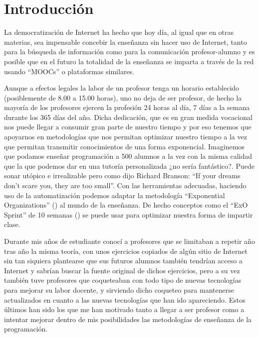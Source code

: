 \chapter{Introducción}

La democratización de Internet ha hecho que hoy día, al igual que en otras materias, sea impensable concebir la enseñanza sin hacer uso de Internet, tanto para la búsqueda de información como para la comunicación profesor-alumno y es posible que en el futuro la totalidad de la enseñanza se imparta a través de la red usando ``MOOCs'' o plataformas similares.

\bigskip
Aunque a efectos legales la labor de un profesor tenga un horario establecido (posiblemente de 8.00 a 15.00 horas), uno no deja de ser profesor, de hecho la mayoría de los profesores ejercen la profesión 24 horas al día, 7 días a la semana durante los 365 días del año. Dicha dedicación, que es en gran medida vocacional nos puede llegar a consumir gran parte de nuestro tiempo y por eso tenemos que apoyarnos en metodologías que nos permitan optimizar nuestro tiempo a la vez que permitan transmitir conocimientos de una forma exponencial. Imaginemos que podamos enseñar programación a 500 alumnos a la vez con la misma calidad que la que podemos dar en una tutoría personalizada ¿no sería fantástico?. Puede sonar utópico e irrealizable pero como dijo Richard Branson: ``If your dreams don’t scare you, they are too small''. Con las herramientas adecuadas, haciendo uso de la automatización podemos adaptar la metodología ``Exponential Organizations'' (\cite{ismail_exponential_2014}) al mundo de la enseñanza. De hecho conceptos como el ``ExO Sprint'' de 10 semanas (\cite{ismail_exponential_2018}) se puede usar para optimizar nuestra forma de impartir clase.

\bigskip
Durante mis años de estudiante conocí a profesores que se limitaban a repetir año tras año la misma teoría, con unos ejercicios copiados de algún sitio de Internet sin tan siquiera plantearse que sus futuros alumnos también tendrían acceso a Internet y sabrían buscar la fuente original de dichos ejercicios, pero a su vez también tuve profesores que coqueteaban con todo tipo de nuevas tecnologías para mejorar su labor docente, y sirviendo dicho coqueteo para mantenerse actualizados en cuanto a las nuevas tecnologías que han ido apareciendo. Estos últimos han sido los que me han motivado tanto a llegar a ser profesor como a intentar mejorar dentro de mis posibilidades las metodologías de enseñanza de la programación.


